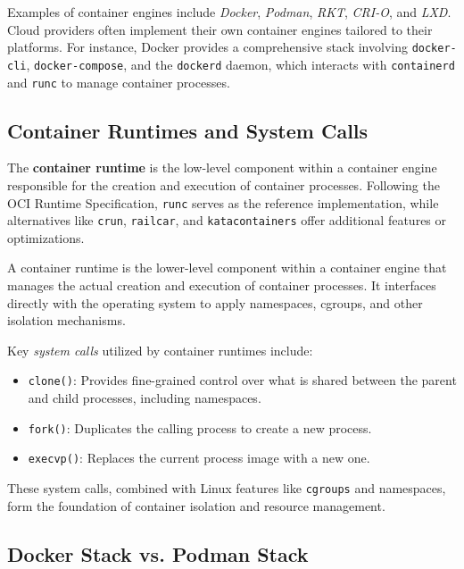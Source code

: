 Examples of container engines include \textit{Docker}, \textit{Podman}, \textit{RKT}, \textit{CRI-O}, and \textit{LXD}. Cloud providers often implement their own container engines tailored to their platforms. For instance, Docker provides a comprehensive stack involving \texttt{docker-cli}, \texttt{docker-compose}, and the \texttt{dockerd} daemon, which interacts with \texttt{containerd} and \texttt{runc} to manage container processes.

\subsection{Container Runtimes and System Calls}

The \textbf{container runtime} is the low-level component within a container engine responsible for the creation and execution of container processes. Following the OCI Runtime Specification, \texttt{runc} serves as the reference implementation, while alternatives like \texttt{crun}, \texttt{railcar}, and \texttt{katacontainers} offer additional features or optimizations.

\begin{definitionblock}
A container runtime is the lower-level component within a container engine that manages the actual creation and execution of container processes. It interfaces directly with the operating system to apply namespaces, cgroups, and other isolation mechanisms.
\end{definitionblock}

Key \textit{system calls} utilized by container runtimes include:
\begin{itemize}
    \item \texttt{clone()}: Provides fine-grained control over what is shared between the parent and child processes, including namespaces.
    \item \texttt{fork()}: Duplicates the calling process to create a new process.
    \item \texttt{execvp()}: Replaces the current process image with a new one.
\end{itemize}

These system calls, combined with Linux features like \texttt{cgroups} and namespaces, form the foundation of container isolation and resource management.

\subsection{Docker Stack vs. Podman Stack}

